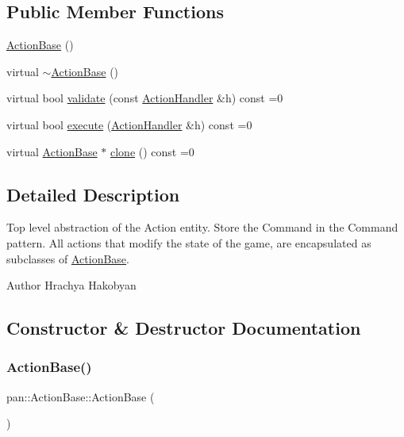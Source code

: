 \subsection*{Public Member Functions}
\begin{DoxyCompactItemize}
\item 
\hyperlink{classpan_1_1_action_base_af413c6b934cf5a26e8fc3af5eebad773}{Action\+Base} ()
\item 
virtual \hyperlink{classpan_1_1_action_base_aac947bf1ed49830f4082727a54989420}{$\sim$\+Action\+Base} ()
\item 
virtual bool \hyperlink{classpan_1_1_action_base_adf042004e303511c8948de5502a59708}{validate} (const \hyperlink{classpan_1_1_action_handler}{Action\+Handler} \&h) const =0
\item 
virtual bool \hyperlink{classpan_1_1_action_base_aba9691736fd1f5ef40a523e988eef6fa}{execute} (\hyperlink{classpan_1_1_action_handler}{Action\+Handler} \&h) const =0
\item 
virtual \hyperlink{classpan_1_1_action_base}{Action\+Base} $\ast$ \hyperlink{classpan_1_1_action_base_a437f541998e59225ab13096a3c8f01c1}{clone} () const =0
\end{DoxyCompactItemize}


\subsection{Detailed Description}
Top level abstraction of the Action entity. Store the Command in the Command pattern. All actions that modify the state of the game, are encapsulated as subclasses of \hyperlink{classpan_1_1_action_base}{Action\+Base}. 

\begin{DoxyAuthor}{Author}
Hrachya Hakobyan 
\end{DoxyAuthor}


\subsection{Constructor \& Destructor Documentation}
\mbox{\label{classpan_1_1_action_base_af413c6b934cf5a26e8fc3af5eebad773}} 
\subsubsection{\texorpdfstring{Action\+Base()}{ActionBase()}}
{\footnotesize\ttfamily pan\+::\+Action\+Base\+::\+Action\+Base (\begin{DoxyParamCaption}{ }\end{DoxyParamCaption})\hspace{0.3cm}{\ttfamily [inline]}}

